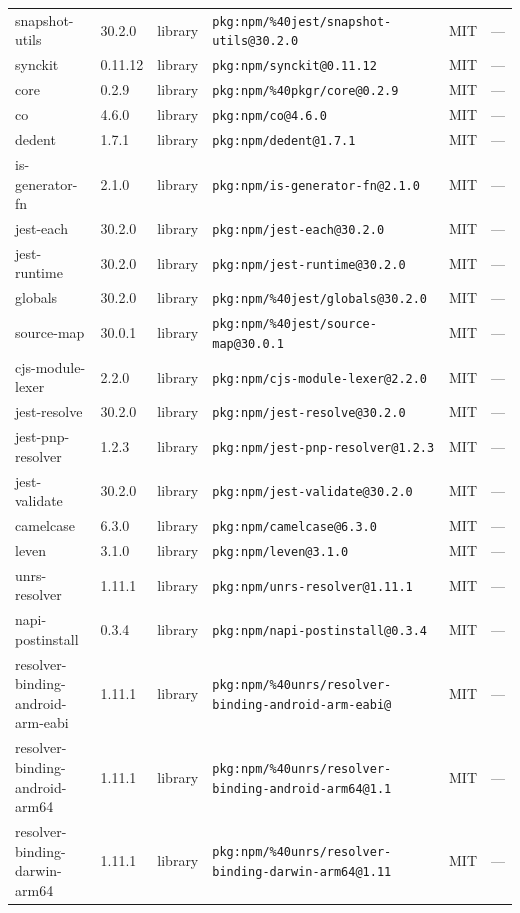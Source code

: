 \documentclass[11pt]{article}
\begin{document}
\begin{longtable}{|l|l|l|p{2.2cm}|l|p{4cm}|}
snapshot-utils & 30.2.0 & library & \texttt{pkg:npm/\%40jest/snapshot-utils@30.2.0} & MIT & — \\
synckit & 0.11.12 & library & \texttt{pkg:npm/synckit@0.11.12} & MIT & — \\
core & 0.2.9 & library & \texttt{pkg:npm/\%40pkgr/core@0.2.9} & MIT & — \\
co & 4.6.0 & library & \texttt{pkg:npm/co@4.6.0} & MIT & — \\
dedent & 1.7.1 & library & \texttt{pkg:npm/dedent@1.7.1} & MIT & — \\
is-generator-fn & 2.1.0 & library & \texttt{pkg:npm/is-generator-fn@2.1.0} & MIT & — \\
jest-each & 30.2.0 & library & \texttt{pkg:npm/jest-each@30.2.0} & MIT & — \\
jest-runtime & 30.2.0 & library & \texttt{pkg:npm/jest-runtime@30.2.0} & MIT & — \\
globals & 30.2.0 & library & \texttt{pkg:npm/\%40jest/globals@30.2.0} & MIT & — \\
source-map & 30.0.1 & library & \texttt{pkg:npm/\%40jest/source-map@30.0.1} & MIT & — \\
cjs-module-lexer & 2.2.0 & library & \texttt{pkg:npm/cjs-module-lexer@2.2.0} & MIT & — \\
jest-resolve & 30.2.0 & library & \texttt{pkg:npm/jest-resolve@30.2.0} & MIT & — \\
jest-pnp-resolver & 1.2.3 & library & \texttt{pkg:npm/jest-pnp-resolver@1.2.3} & MIT & — \\
jest-validate & 30.2.0 & library & \texttt{pkg:npm/jest-validate@30.2.0} & MIT & — \\
camelcase & 6.3.0 & library & \texttt{pkg:npm/camelcase@6.3.0} & MIT & — \\
leven & 3.1.0 & library & \texttt{pkg:npm/leven@3.1.0} & MIT & — \\
unrs-resolver & 1.11.1 & library & \texttt{pkg:npm/unrs-resolver@1.11.1} & MIT & — \\
napi-postinstall & 0.3.4 & library & \texttt{pkg:npm/napi-postinstall@0.3.4} & MIT & — \\
resolver-binding-android-arm-eabi & 1.11.1 & library & \texttt{pkg:npm/\%40unrs/resolver-binding-android-arm-eabi@} & MIT & — \\
resolver-binding-android-arm64 & 1.11.1 & library & \texttt{pkg:npm/\%40unrs/resolver-binding-android-arm64@1.1} & MIT & — \\
resolver-binding-darwin-arm64 & 1.11.1 & library & \texttt{pkg:npm/\%40unrs/resolver-binding-darwin-arm64@1.11} & MIT & — \\

\end{longtable}
\end{document}
